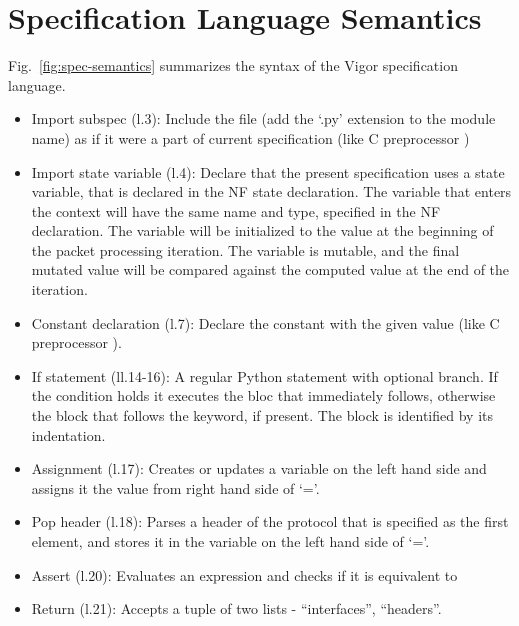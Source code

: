 \documentclass[]{report}
\begin{document}
\section*{Specification Language Semantics}
\label{sec:spec-semantics}

Fig.~\ref{fig:spec-semantics} summarizes the syntax of the Vigor specification language.

\begin{figure*}[t]
  
  \caption{BNF grammar of Vigor specification language}
  \label{fig:spec-semantics}
\end{figure*}

\begin{itemize}
  \item Import subspec (l.3): Include the file (add the `.py' extension to the module name) as if it were a part of current specification (like C preprocessor )
  \item Import state variable (l.4): Declare that the present specification uses a state variable, that is declared in the NF state declaration.
    The variable that enters the context will have the same name and type, specified in the NF declaration.
    The variable will be initialized to the value at the beginning of the packet processing iteration.
    The variable is mutable, and the final mutated value will be compared against the computed value at the end of the iteration.
  \item Constant declaration (l.7): Declare the constant with the given value (like C preprocessor ).
  \item If statement (ll.14-16): A regular Python  statement with optional  branch.
    If the condition holds it executes the bloc that immediately follows, otherwise the block that follows the  keyword, if present.
    The block is identified by its indentation.
  \item Assignment (l.17): Creates or updates a variable on the left hand side and assigns it the value from right hand side of `='.
  \item Pop header (l.18): Parses a header of the protocol that is specified as the first element, and stores it in the variable on the left hand side of `='.
  \item Assert (l.20): Evaluates an expression and checks if it is equivalent to 
  \item Return (l.21): Accepts a tuple of two lists - ``interfaces'', ``headers''.

\end{itemize}
\end{document}
